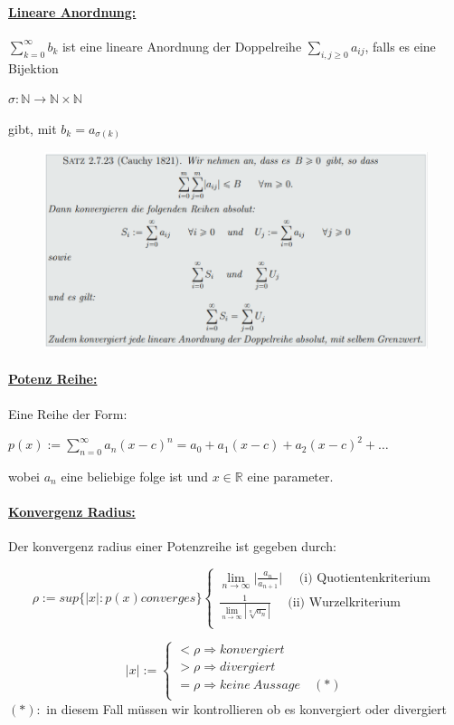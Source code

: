 \documentclass[8pt]{extreport}
\begin{document}
\paragraph{\underline{Lineare Anordnung:}} $\displaystyle\sum_{k = 0}^{\infty}b_k$ ist eine lineare Anordnung der Doppelreihe $\displaystyle\sum_{i,j \geq 0}a_{ij}$, falls es eine Bijektion
\begin{center}
$\sigma : \mathbb{N} \rightarrow \mathbb{N} \times \mathbb{N}$
\end{center}
gibt, mit $b_k = a_{\sigma(k)}$
\begin{figure}[h!]
  \centering\includegraphics[width = \linewidth, scale =1]{Analysis1pic1.png}
  \caption{}
  \label{pic1}
\end{figure}
\paragraph{\underline{Potenz Reihe:}} Eine Reihe der Form:
\begin{center}
$p(x):= \displaystyle\sum_{n=0}^{\infty} a_n(x-c)^n = a_0 + a_1(x-c) + a_2(x-c)^2 + \dots$
\end{center}
wobei $a_n$ eine beliebige folge ist und $x \in \mathbb{R}$ eine parameter.
\paragraph{\underline{Konvergenz Radius:}} Der konvergenz radius einer Potenzreihe ist gegeben durch:
\begin{center}
\[
\rho := sup\{|x|: p(x) converges \}
	\begin{cases}
	\lim\limits_{n \to \infty}\big| \frac{a_n}{a_{n+1}} \big| \quad \text{ (i) Quotientenkriterium }  \\
	\frac{1}{\lim\limits_{n \to \infty} | \sqrt[n]{a_n} |} \quad \text{ (ii) Wurzelkriterium}\\
	\end{cases}
\] 

\[
|x|:=
\begin{cases}
 	< \rho \Rightarrow konvergiert \\
	> \rho \Rightarrow divergiert\\
	= \rho \Rightarrow keine \ Aussage \quad (\ast) \\
\end{cases}
\]
$(\ast):$ in diesem Fall müssen wir kontrollieren ob es konvergiert oder divergiert 
\end{center}
\end{document}
